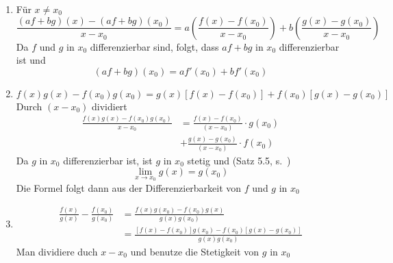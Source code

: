 \begin{beweis}{}
\begin{enumerate}
\item Für $x\not=x_0$
\[\frac{{\left( {af + bg} \right)\left( x \right) - \left( {af + bg} \right)\left( {{x_0}} \right)}}{{x - {x_0}}} = a\left( {\frac{{f\left( x \right) - f\left( {{x_0}} \right)}}{{x - {x_0}}}} \right) + b\left( {\frac{{g\left( x \right) - g\left( {{x_0}} \right)}}{{x - {x_0}}}} \right)\]
Da $f$ und $g$ in $x_0$ differenzierbar sind, folgt, dass $af+bg$ in $x_0$ differenzierbar ist und
\[\left( {af + bg} \right)\left( {{x_0}} \right) = af'\left( {{x_0}} \right) + bf'\left( {{x_0}} \right)\]
\item \[f\left( x \right)g\left( x \right) - f\left( {{x_0}} \right)g\left( {{x_0}} \right) = g\left( x \right)\left[ {f\left( x \right) - f\left( {{x_0}} \right)} \right] + f\left( {{x_0}} \right)\left[ {g\left( x \right) - g\left( {{x_0}} \right)} \right]\]
Durch $\left( x-x_0\right)$ dividiert
\begin{align*}
\frac{{f\left( x \right)g\left( x \right) - f\left( {{x_0}} \right)g\left( {{x_0}} \right)}}{{x - {x_0}}} &= \frac{{f\left( x \right) - f\left( {{x_0}} \right)}}{{\left( {x - {x_0}} \right)}} \cdot g\left( {{x_0}} \right)\\
 &+ \frac{{g\left( x \right) - g\left( {{x_0}} \right)}}{{\left( {x - {x_0}} \right)}} \cdot f\left( {{x_0}} \right)
\end{align*}
Da $g$ in $x_0$ differenzierbar ist, ist $g$ in $x_0$ stetig und (Satz 5.5, s.~\pageref{satz5.5})
\[\mathop {\lim }\limits_{x \to {x_0}} g\left( x \right) = g\left( {{x_0}} \right)\]
Die Formel folgt dann aus der Differenzierbarkeit von $f$ und $g$ in $x_0$
\item \begin{align*}
\frac{{f\left( x \right)}}{{g\left( x \right)}} - \frac{{f\left( {{x_0}} \right)}}{{g\left( {{x_0}} \right)}} &= \frac{{f\left( x \right)g\left( {{x_0}} \right) - f\left( {{x_0}} \right)g\left( x \right)}}{{g\left( x \right)g\left( {{x_0}} \right)}}\\
 &= \frac{{\left[ {f\left( x \right) - f\left( {{x_0}} \right)} \right]g\left( {{x_0}} \right) - f\left( {{x_0}} \right)\left[ {g\left( x \right) - g\left( {{x_0}} \right)} \right]}}{{g\left( x \right)g\left( {{x_0}} \right)}}
\end{align*}
Man dividiere duch $x-x_0$ und benutze die Stetigkeit von $g$ in $x_0$
\end{enumerate}
\end{beweis}
